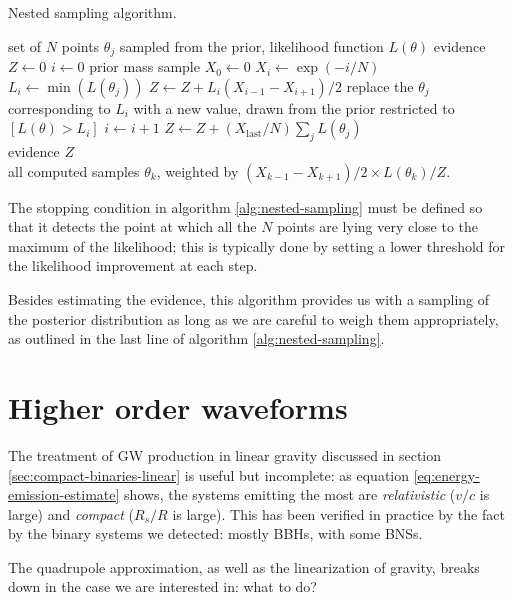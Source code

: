\documentclass[main.tex]{subfiles}
\begin{document}
\begin{algorithm}
\caption{Nested sampling algorithm. }\label{alg:nested-sampling}
\begin{algorithmic}
\Require set of \(N\) points \(\theta _j\) sampled from the prior, likelihood function \(L(\theta )\)
\State evidence $Z \gets 0$
\State \(i \gets 0\)
\State prior mass sample $X_0  \gets 0$
\State \(X_i \gets \exp(- i / N)\) 
\State \(L_i \gets \min(L(\theta _j))\)
\State \(Z \gets Z + L_i (X_{i-1} - X_{i+1}) / 2\)
\State replace the \(\theta _j\) corresponding to \(L_i\) with a new value, 
\State drawn from the prior restricted to \([L(\theta ) > L_i]\)
\State \(i \gets i+1\)
\EndWhile 
\State \(Z \gets Z + (X _{\text{last}} / N) \sum _{j} L(\theta _j)\) \\
\Return evidence \(Z\) \\
\Return all computed samples \(\theta _k\), weighted by \((X_{k-1} - X_{k+1}) / 2 \times L(\theta_k) / Z \).
\end{algorithmic}
\end{algorithm}

The stopping condition in algorithm \ref{alg:nested-sampling} must be defined so that it detects the point at which all the \(N\) points are lying very close to the maximum of the likelihood; this is typically done by setting a lower threshold for the likelihood improvement at each step. 

Besides estimating the evidence, this algorithm provides us with a sampling of the posterior distribution as long as we are careful to weigh them appropriately, as outlined in the last line of algorithm \ref{alg:nested-sampling}.

\section{Higher order waveforms}

The treatment of \ac{GW} production in linear gravity discussed in section \ref{sec:compact-binaries-linear} is useful but incomplete: as equation \eqref{eq:energy-emission-estimate} shows, the systems emitting the most are \emph{relativistic} (\(v/c\) is large) and \emph{compact} (\(R_s / R\) is large). 
This has been verified in practice by the fact by the binary systems we detected: mostly \acsp{BBH}, with some \acsp{BNS}.

The quadrupole approximation, as well as the linearization of gravity, breaks down in the case we are interested in: what to do? 
\end{document}

